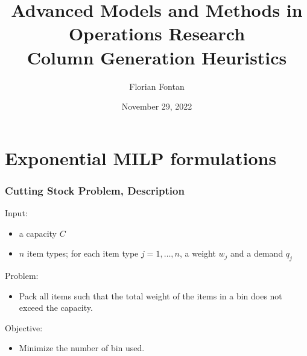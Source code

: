 \documentclass[10pt]{beamer}
\author{Florian Fontan}
\title{Advanced Models and Methods in Operations Research \\ Column Generation Heuristics}
\date{November 29, 2022}
\begin{document}
\newcommand{\customcite}[1]{\citetitle{#1}, \citeauthor{#1}, \citeyear{#1}}


\maketitle

\section{Exponential MILP formulations}

\begin{frame}
  \frametitle{Cutting Stock Problem, Description}

  Input:
  \begin{itemize}
    \item a capacity \alert{$C$}
    \item $n$ item types; for each item type $j = 1, \dots, n$, a weight \alert{$w_j$} and a demand \alert{$q_j$}
  \end{itemize}

  Problem:
  \begin{itemize}
    \item Pack all items such that the total weight of the items in a bin does not exceed the capacity.
  \end{itemize}

  Objective:
  \begin{itemize}
    \item Minimize the number of bin used.
  \end{itemize}
\end{frame}
\end{document}
